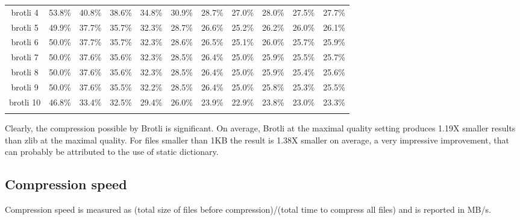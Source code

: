 \documentclass[12pt]{article}
\begin{document}
\begin{table}[H]
\begin{threeparttable}
\begin{tabular}{ccccccccccc}
  brotli 4 & 53.8\% & 40.8\% & 38.6\% & 34.8\% & 30.9\% & 28.7\% & 27.0\% & 28.0\% & 27.5\% & 27.7\% \\
  brotli 5 & 49.9\% & 37.7\% & 35.7\% & 32.3\% & 28.7\% & 26.6\% & 25.2\% & 26.2\% & 26.0\% & 26.1\% \\
  brotli 6 & 50.0\% & 37.7\% & 35.7\% & 32.3\% & 28.6\% & 26.5\% & 25.1\% & 26.0\% & 25.7\% & 25.9\% \\
  brotli 7 & 50.0\% & 37.6\% & 35.6\% & 32.3\% & 28.5\% & 26.4\% & 25.0\% & 25.9\% & 25.5\% & 25.7\% \\
  brotli 8 & 50.0\% & 37.6\% & 35.6\% & 32.3\% & 28.5\% & 26.4\% & 25.0\% & 25.9\% & 25.4\% & 25.6\% \\
  brotli 9 & 50.0\% & 37.6\% & 35.5\% & 32.2\% & 28.5\% & 26.4\% & 25.0\% & 25.8\% & 25.3\% & 25.5\% \\
  brotli 10 & 46.8\% & 33.4\% & 32.5\% & 29.4\% & 26.0\% & 23.9\% & 22.9\% & 23.8\% & 23.0\% & 23.3\% \\
  \bottomrule\addlinespace[1ex]
\end{tabular}
\end{threeparttable}
\end{table}

Clearly, the compression possible by Brotli is significant. On average,
Brotli at the maximal quality setting produces 1.19X smaller results
than zlib at the maximal quality. For files smaller than 1KB the result
is 1.38X smaller on average, a very impressive improvement, that can
probably be attributed to the use of static dictionary.

\subsection{Compression speed}

Compression speed is measured as (total size of files before
compression)/(total time to compress all files) and is reported in MB/s.
\end{document}

